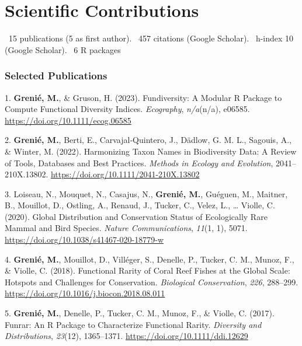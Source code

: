 \documentclass[10pt,a4paper,]{article}
\begin{document}
\hypertarget{scientific-contributions}{%
\section{Scientific Contributions}\label{scientific-contributions}}

\faFile*~15 publications (5 as first author). \faQuoteLeft~457 citations
(Google Scholar). \faHSquare~h-index 10 (Google Scholar). \faRProject~6
R packages

\hypertarget{selected-publications}{%
\subsubsection{Selected Publications}\label{selected-publications}}

\hypertarget{bibliography}{}
\leavevmode{}%
1. \textbf{Grenié, M.}, \& Gruson, H. (2023). Fundiversity: A Modular R
Package to Compute Functional Diversity Indices. \emph{Ecography},
\emph{n/a}(n/a), e06585. \url{https://doi.org/10.1111/ecog.06585}

\leavevmode{}%
2. \textbf{Grenié, M.}, Berti, E., Carvajal‐Quintero, J., Dädlow, G. M.
L., Sagouis, A., \& Winter, M. (2022). Harmonizing Taxon Names in
Biodiversity Data: A Review of Tools, Databases and Best Practices.
\emph{Methods in Ecology and Evolution}, 2041--210X.13802.
\url{https://doi.org/10.1111/2041-210X.13802}

\leavevmode{}%
3. Loiseau, N., Mouquet, N., Casajus, N., \textbf{Grenié, M.}, Guéguen,
M., Maitner, B., Mouillot, D., Ostling, A., Renaud, J., Tucker, C.,
Velez, L., \ldots{} Violle, C. (2020). Global Distribution and
Conservation Status of Ecologically Rare Mammal and Bird Species.
\emph{Nature Communications}, \emph{11}(1, 1), 5071.
\url{https://doi.org/10.1038/s41467-020-18779-w}

\leavevmode{}%
4. \textbf{Grenié, M.}, Mouillot, D., Villéger, S., Denelle, P., Tucker,
C. M., Munoz, F., \& Violle, C. (2018). Functional Rarity of Coral Reef
Fishes at the Global Scale: Hotspots and Challenges for Conservation.
\emph{Biological Conservation}, \emph{226}, 288--299.
\url{https://doi.org/10.1016/j.biocon.2018.08.011}

\leavevmode{}%
5. \textbf{Grenié, M.}, Denelle, P., Tucker, C. M., Munoz, F., \&
Violle, C. (2017). Funrar: An R Package to Characterize Functional
Rarity. \emph{Diversity and Distributions}, \emph{23}(12), 1365--1371.
\url{https://doi.org/10.1111/ddi.12629}
\end{document}
